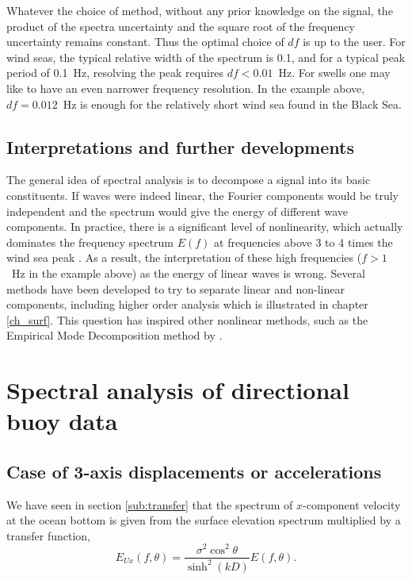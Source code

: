 Whatever the choice of method, without any prior knowledge on the signal, the product of the spectra uncertainty and the square root of the frequency uncertainty remains constant. Thus the optimal choice of $df$ is up to the user. For wind seas, the typical relative width of the spectrum is 0.1, and for a typical peak period of 0.1~Hz, resolving the peak requires $df < 0.01$~Hz. For swells one may like to have an even narrower frequency resolution.  In the example above, $df=0.012$~Hz is 
enough for the relatively short wind sea found in the Black Sea. 

\subsection{Interpretations and further developments}
The general idea of spectral analysis is to decompose a signal into its basic constituents. If waves were indeed linear, the Fourier components would be truly independent and the spectrum would give the energy of different wave components. In practice, there is a significant level of nonlinearity, which actually dominates the frequency spectrum $E(f)$ at frequencies above 3 to 4 times the wind sea peak \citep[e.g.][]{Leckler&al.2015}. As a result, the interpretation of these high frequencies ($f > 1$~Hz in the example above) as the energy of linear waves is wrong. Several methods have been developed to try to separate linear and non-linear components, including higher order analysis \citep{Hasselmann&al.1963} which is illustrated in chapter \ref{ch_surf}. This question has inspired other nonlinear methods, such as the Empirical Mode Decomposition method by \cite{Huang&al.1998}.


\section{Spectral analysis of directional buoy data}
\subsection{Case of 3-axis displacements or accelerations}
We have seen in section  \ref{sub:transfer} that the spectrum of $x$-component velocity  at the ocean bottom 
is given from the surface elevation spectrum multiplied by a transfer function,
\begin{equation}
    E_{Ux} \left( f,\theta \right)  = \frac{\sigma^2 \cos^2 \theta}{\sinh^2 (kD)} E\left( f,\theta
    \right)\label{EUX }.
\end{equation}


